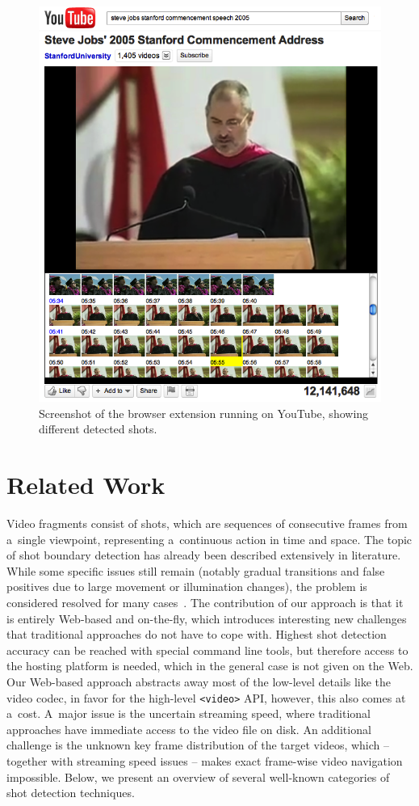 \begin{figure}
\begin{center}
   \includegraphics[width=0.8\linewidth]{./stevejobs.png}
\end{center}
   \caption{Screenshot of the browser extension running on YouTube, showing different detected shots.}
\label{fig:screenshot}
\end{figure}

\section{Related Work} \label{sec:related-work}
Video fragments consist of shots, which are sequences of consecutive frames from a~single viewpoint, representing a~continuous action in time and space. The topic of shot boundary detection has already been described extensively in literature. While some specific issues still remain (notably gradual transitions and false positives due to large movement or illumination changes), the problem is considered resolved for many cases~\cite{Hanjalic2002, Yuan2007}.
The contribution of our approach is that it is entirely Web-based and on-the-fly, which introduces interesting new challenges that traditional approaches do not have to cope with.
Highest shot detection accuracy can be reached with special command line tools, but therefore access to the hosting platform is needed, which in the general case is not given on the Web.
Our Web-based approach abstracts away most of the low-level details like the video codec, in favor for the high-level \texttt{<video>} API, however, this also comes at a~cost.
A~major issue is the uncertain streaming speed, where traditional approaches have immediate access to the video file on disk.
An additional challenge is the unknown key frame distribution of the target videos, which -- together with streaming speed issues -- makes exact frame-wise video navigation impossible.
Below, we present an overview of several well-known categories of shot detection techniques.


